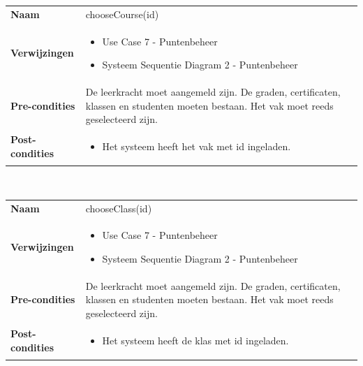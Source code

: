 \documentclass[a4paper]{article}
\begin{document}
\begin{tabularx}{\textwidth}{|l X|}
    \hline
    \textbf{Naam} & chooseCourse(id) \\
    \textbf{Verwijzingen} & \begin{itemize}[leftmargin=*]
        \item Use Case 7 - Puntenbeheer
        \item Systeem Sequentie Diagram 2 - Puntenbeheer
    \end{itemize}\\
    \textbf{Pre-condities} & De leerkracht moet aangemeld zijn. De graden, certificaten, klassen en studenten moeten bestaan. Het vak moet reeds geselecteerd zijn.\\
    \textbf{Post-condities} & \begin{itemize}[leftmargin=*]
        \item Het systeem heeft het vak met id ingeladen.
    \end{itemize}\\
    \hline
\end{tabularx}\\

\begin{tabularx}{\textwidth}{|l X|}
    \hline
    \textbf{Naam} & chooseClass(id) \\
    \textbf{Verwijzingen} & \begin{itemize}[leftmargin=*]
        \item Use Case 7 - Puntenbeheer
        \item Systeem Sequentie Diagram 2 - Puntenbeheer
    \end{itemize}\\
    \textbf{Pre-condities} & De leerkracht moet aangemeld zijn. De graden, certificaten, klassen en studenten moeten bestaan. Het vak moet reeds geselecteerd zijn.\\
    \textbf{Post-condities} & \begin{itemize}[leftmargin=*]
        \item Het systeem heeft de klas met id ingeladen.
    \end{itemize}\\
    \hline
\end{tabularx}\\
\end{document}
